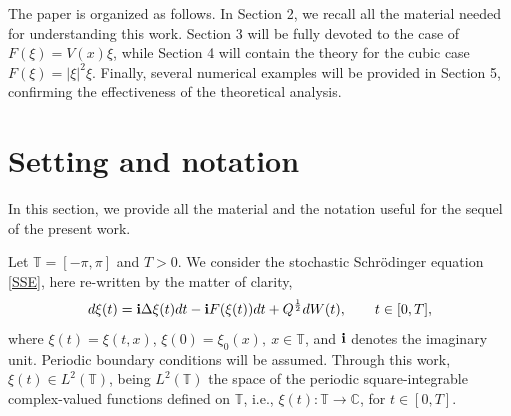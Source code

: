 \documentclass[a4paper]{amsart}
\begin{document}



The paper is organized as follows. In Section 2, we recall all the material needed for understanding this work. Section 3 will be fully devoted to the case of $F(\xi)=V(x)\xi$, while Section 4 will contain the theory for the cubic case $F(\xi)=|\xi|^2\xi.$ Finally, several numerical examples will be provided in Section 5, confirming the effectiveness of the theoretical analysis.



\section{Setting and notation}
In this section, we provide all the material and the notation useful for the sequel of the present work. 

Let $\mathbb{T}=[-\pi,\pi]$ and $T>0$. We consider the stochastic Schrödinger equation \eqref{SSE}, here re-written by the matter of clarity,
\begin{equation}
    \label{SSE_2}
d\xi(t)={\bf i}\Delta \xi(t)dt-{\bf i}F(\xi(t))dt+Q^{\frac{1}{2}}dW(t),\qquad  t\in[0,T],
\end{equation}
where $\xi(t)=\xi(t,x)$, $\xi(0)=\xi_0(x), \ x\in\mathbb{T}$, and ${\bf i}$ denotes the imaginary unit. Periodic boundary conditions will be assumed. Through this work, $\xi(t)\in L^2(\mathbb{T})$, being $L^2(\mathbb{T})$ the space of the periodic square-integrable complex-valued functions defined on $\mathbb{T}$, i.e., $\xi(t):\mathbb{T}\to \mathbb{C}$, for $t\in[0,T]$. 
\end{document}

